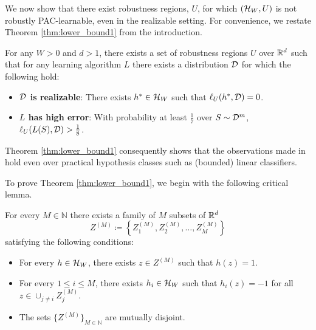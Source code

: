 We now show that there exist robustness regions, $U$, for which $(\mathcal H_W, U)$ is not robustly PAC-learnable, even in the realizable setting. For convenience, we restate Theorem \ref{thm:lower_bound1} from the introduction.

\begin{thm}\label{thm:lower_bound1}
For any $W>0$ and $d>1$, there exists a set of robustness regions $U$ over $\mathbb{R}^d$ such that for any learning algorithm $L$ there exists a distribution $\mathcal D$ for which the following hold:
\begin{itemize}
	\item \textbf{$\mathcal D$ is realizable}: There exists $h^* \in \mathcal H_W$ such that $\ell_U(h^*, \mathcal D) = 0$.
	\item \textbf{$L$ has high error}: With probability at least $\frac{1}{7}$ over $S \sim \mathcal D^m$, $\ell_U(L(S), \mathcal D) > \frac{1}{8}$. 
\end{itemize}
\end{thm}

Theorem \ref{thm:lower_bound1} consequently shows that the observations made in \cite{Srebro19} hold even over practical hypothesis classes such as (bounded) linear classifiers.

To prove Theorem \ref{thm:lower_bound1}, we begin with the following critical lemma.
\begin{lem}\label{lem:finding_shatter}
For every $M \in \mathbb{N}$ there exists a family of $M$ subsets of $\mathbb{R}^d$
\[
Z^{(M)} \coloneqq \left\{Z^{(M)}_1, Z^{(M)}_2, \dots, Z^{(M)}_M\right\}
\]
satisfying the following conditions:
\begin{itemize}
	\item For every $h \in \mathcal H_W$, there exists $z \in Z^{(M)}$ such that $h(z) = 1$.
	\item For every $1 \leq i \leq M$, there exists $h_i \in \mathcal H_W$ such that $h_i(z) = -1$ for all $z \in \cup_{j \neq i} Z^{(M)}_j$.
	\item The sets $\{Z^{(M)}\}_{M \in \mathbb{N}}$ are mutually disjoint.
\end{itemize}
\end{lem}

